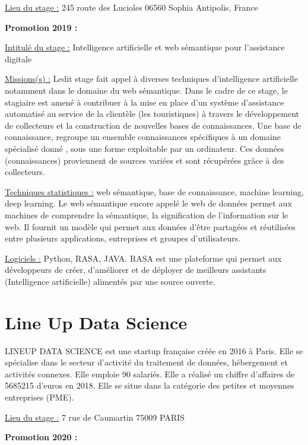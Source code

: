 \documentclass[
  letterpaper,
  DIV=11,
  numbers=noendperiod]{scrreprt}
\begin{document}
\uline{Lieu du stage :} 245 route des Lucioles 06560 Sophia Antipolis,
France

\textbf{Promotion 2019 :}

\uline{Intitulé du stage :} Intelligence artificielle et web sémantique
pour l'assistance digitale

\uline{Missions(s) :} Ledit stage fait appel à diverses techniques
d'intelligence artificielle notamment dans le domaine du web sémantique.
Dans le cadre de ce stage, le stagiaire est amené à contribuer à la mise
en place d'un système d'assistance automatisé au service de la clientèle
(les touristiques) à travers le développement de collecteurs et la
construction de nouvelles bases de connaissances. Une base de
connaissance, regroupe un ensemble connaissances spécifiques à un
domaine spécialisé donné , sous une forme exploitable par un ordinateur.
Ces données (connaissances) proviennent de sources variées et sont
récupérées grâce à des collecteurs.

\uline{Techniques statistiques :} web sémantique, base de connaissance,
machine learning, deep learning. Le web sémantique encore appelé le web
de données permet aux machines de comprendre la sémantique, la
signification de l'information sur le web. Il fournit un modèle qui
permet aux données d'être partagées et réutilisées entre plusieurs
applications, entreprises et groupes d'utilisateurs.

\uline{Logiciels :} Python, RASA, JAVA. RASA est une plateforme qui
permet aux développeurs de créer, d'améliorer et de déployer de
meilleurs assistants (Intelligence artificielle) alimentés par une
source ouverte.

\hypertarget{line-up-data-science}{%
\section{\texorpdfstring{\textbf{Line Up Data
Science}}{Line Up Data Science}}\label{line-up-data-science}}

LINEUP DATA SCIENCE est une startup française créée en 2016 à Paris.
Elle se spécialise dans le secteur d'activité du traitement de données,
hébergement et activités connexes. Elle emploie 90 salariés. Elle a
réalisé un chiffre d'affaires de 5685215 d'euros en 2018. Elle se situe
dans la catégorie des petites et moyennes entreprises (PME).

\uline{Lieu du stage :} 7 rue de Caumartin 75009 PARIS

\textbf{Promotion 2020 :}
\end{document}

